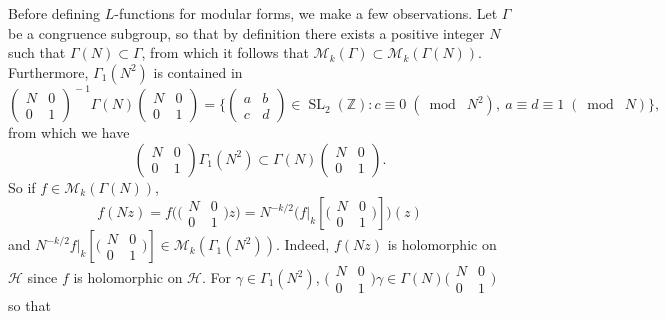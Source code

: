 \documentclass[10pt,leqno,twoside]{article}
\theoremstyle{plain}
\theoremstyle{definition}
\numberwithin{equation}{section}
\numberwithin{lem}{section}
\DeclareMathOperator{\SL}{SL}
\newcommand{\smod}[1]{\;(\bmod\; #1)}
\newcommand{\abcd}{\begin{pmatrix}
    a & b \\ c & d
\end{pmatrix}}
\newcommand{\slz}{\SL_2(\mathbb{Z})}
\begin{document}
Before defining $L$-functions for modular forms, we make a few observations. Let $\varGamma$ be a congruence subgroup, so that by definition there exists a positive integer $N$ such that $\varGamma(N)\subset \varGamma$, from which it follows that $\mathcal M_k(\varGamma)\subset \mathcal M_k(\varGamma(N))$. Furthermore, $\varGamma_1(N^2)$ is contained in 
\[\begin{pmatrix}
    N & 0 \\ 0 & 1
\end{pmatrix}^{\!-1}\varGamma(N)\begin{pmatrix}
    N & 0 \\ 0 & 1
\end{pmatrix} = \Big\{\abcd\in \slz : c\equiv 0 \smod {N^2},~ a\equiv d\equiv 1\smod N\Big\},\] from which we have
\[\begin{pmatrix}
    N & 0 \\ 0 & 1
\end{pmatrix}\varGamma_1(N^2)\subset \varGamma(N)\begin{pmatrix}
    N & 0 \\ 0 & 1
\end{pmatrix}.\] So if $f\in \mathcal M_k(\varGamma(N))$,
\[f(Nz) = f\big(\big(\!\begin{smallmatrix}
    N & 0 \\ 0 & 1
\end{smallmatrix}\!\big)z\big) = N^{-k/2}\Big(f|_k[\big(\!\begin{smallmatrix}
    N & 0 \\ 0 & 1
\end{smallmatrix}\!\big)]\Big)(z)\] and $N^{-k/2}f|_k[\big(\!\begin{smallmatrix}
    N & 0 \\ 0 & 1
\end{smallmatrix}\!\big)]\in \mathcal M_k(\varGamma_1(N^2))$. Indeed, $f(Nz)$ is holomorphic on $\mathcal H$ since $f$ is holomorphic on $\mathcal H$. For $\gamma\in\varGamma_1(N^2)$, $\big(\!\begin{smallmatrix}
    N & 0 \\ 0 & 1
\end{smallmatrix}\!\big)\gamma\in \varGamma(N)\big(\!\begin{smallmatrix}
    N & 0 \\ 0 & 1
\end{smallmatrix}\!\big)$ so that
\end{document}
